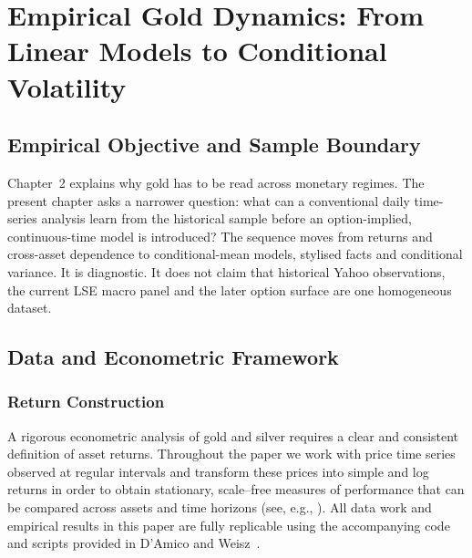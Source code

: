 \chapter{Empirical Gold Dynamics: From Linear Models to Conditional Volatility}

\section{Empirical Objective and Sample Boundary}

Chapter~2 explains why gold has to be read across monetary regimes. The present
chapter asks a narrower question: what can a conventional daily time-series
analysis learn from the historical sample before an option-implied,
continuous-time model is introduced? The sequence moves from returns and
cross-asset dependence to conditional-mean models, stylised facts and
conditional variance. It is diagnostic. It does not claim that historical
Yahoo observations, the current LSE macro panel and the later option surface
are one homogeneous dataset.

\section{Data and Econometric Framework}
\subsection{Return Construction}

A rigorous econometric analysis of gold and silver requires a clear and consistent definition
of asset returns. Throughout the paper we work with price time series observed at regular
intervals and transform these prices into simple and log returns in order to obtain
stationary, scale–free measures of performance that can be compared across assets and time
horizons (see, e.g., ). All data work and empirical results in this paper are fully replicable using the
accompanying code and scripts provided in D'Amico and Weisz~.
